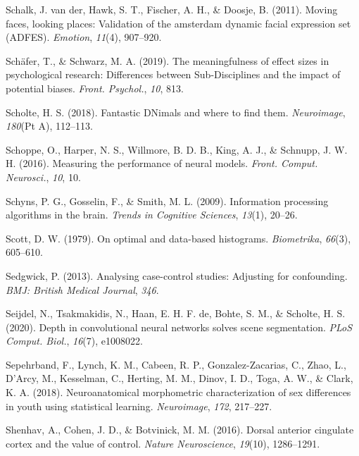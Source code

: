 \documentclass[12pt,american,a4paper,oneside,]{memoir} %
\begin{document}
\leavevmode\hypertarget{ref-Van_der_Schalk2011-bq}{}%
Schalk, J. van der, Hawk, S. T., Fischer, A. H., \& Doosje, B. (2011). Moving faces, looking places: Validation of the amsterdam dynamic facial expression set (ADFES). \emph{Emotion}, \emph{11}(4), 907--920.

\leavevmode\hypertarget{ref-Schafer2019-ue}{}%
Schäfer, T., \& Schwarz, M. A. (2019). The meaningfulness of effect sizes in psychological research: Differences between Sub-Disciplines and the impact of potential biases. \emph{Front. Psychol.}, \emph{10}, 813.

\leavevmode\hypertarget{ref-Scholte2018-he}{}%
Scholte, H. S. (2018). Fantastic DNimals and where to find them. \emph{Neuroimage}, \emph{180}(Pt A), 112--113.

\leavevmode\hypertarget{ref-Schoppe2016-bu}{}%
Schoppe, O., Harper, N. S., Willmore, B. D. B., King, A. J., \& Schnupp, J. W. H. (2016). Measuring the performance of neural models. \emph{Front. Comput. Neurosci.}, \emph{10}, 10.

\leavevmode\hypertarget{ref-schyns2009information}{}%
Schyns, P. G., Gosselin, F., \& Smith, M. L. (2009). Information processing algorithms in the brain. \emph{Trends in Cognitive Sciences}, \emph{13}(1), 20--26.

\leavevmode\hypertarget{ref-scott1979optimal}{}%
Scott, D. W. (1979). On optimal and data-based histograms. \emph{Biometrika}, \emph{66}(3), 605--610.

\leavevmode\hypertarget{ref-Sedgwick2013-op}{}%
Sedgwick, P. (2013). Analysing case-control studies: Adjusting for confounding. \emph{BMJ: British Medical Journal}, \emph{346}.

\leavevmode\hypertarget{ref-Seijdel2020-ff}{}%
Seijdel, N., Tsakmakidis, N., Haan, E. H. F. de, Bohte, S. M., \& Scholte, H. S. (2020). Depth in convolutional neural networks solves scene segmentation. \emph{PLoS Comput. Biol.}, \emph{16}(7), e1008022.

\leavevmode\hypertarget{ref-Sepehrband2018-dy}{}%
Sepehrband, F., Lynch, K. M., Cabeen, R. P., Gonzalez-Zacarias, C., Zhao, L., D'Arcy, M., Kesselman, C., Herting, M. M., Dinov, I. D., Toga, A. W., \& Clark, K. A. (2018). Neuroanatomical morphometric characterization of sex differences in youth using statistical learning. \emph{Neuroimage}, \emph{172}, 217--227.

\leavevmode\hypertarget{ref-shenhav2016dorsal}{}%
Shenhav, A., Cohen, J. D., \& Botvinick, M. M. (2016). Dorsal anterior cingulate cortex and the value of control. \emph{Nature Neuroscience}, \emph{19}(10), 1286--1291.
\end{document}
